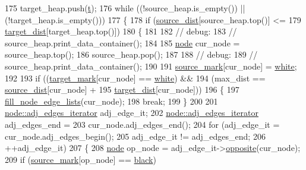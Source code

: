 \begin{DoxyCode}
175     target\_heap.push(\mbox{\hyperlink{classbid__dijkstra_a9370a71076d7807d1f3963e6dad9897e}{t}});
176     \textcolor{keywordflow}{while} ((!source\_heap.is\_empty()) || (!target\_heap.is\_empty()))
177     \{
178     \textcolor{keywordflow}{if} (\mbox{\hyperlink{classbid__dijkstra_a19dc6c350617f0fa5769e5c70781d658}{source\_dist}}[source\_heap.top()] <=
179         \mbox{\hyperlink{classbid__dijkstra_a7a46fe8fe075d798eaca14b37aa15c0d}{target\_dist}}[target\_heap.top()])
180     \{
181 
182         \textcolor{comment}{// debug:}
183         \textcolor{comment}{// source\_heap.print\_data\_container();}
184 
185         \mbox{\hyperlink{classnode}{node}} cur\_node = source\_heap.top();
186         source\_heap.pop();
187 
188         \textcolor{comment}{// debug:}
189         \textcolor{comment}{// source\_heap.print\_data\_container();}
190 
191         \mbox{\hyperlink{classbid__dijkstra_a1b3684b69db38c8eaf9d4fbb056bc392}{source\_mark}}[cur\_node] = \mbox{\hyperlink{classbid__dijkstra_a8b7dcccc9fab2ec5edc8da01029c09d5abbd36b03487d4100360b3d6e94309b7b}{white}};
192 
193         \textcolor{keywordflow}{if} ((\mbox{\hyperlink{classbid__dijkstra_a72bc13758ebe2f752cd15f018c5ba64e}{target\_mark}}[cur\_node] == \mbox{\hyperlink{classbid__dijkstra_a8b7dcccc9fab2ec5edc8da01029c09d5abbd36b03487d4100360b3d6e94309b7b}{white}}) &&
194         (max\_dist == \mbox{\hyperlink{classbid__dijkstra_a19dc6c350617f0fa5769e5c70781d658}{source\_dist}}[cur\_node] +
195             \mbox{\hyperlink{classbid__dijkstra_a7a46fe8fe075d798eaca14b37aa15c0d}{target\_dist}}[cur\_node]))
196         \{
197         \mbox{\hyperlink{classbid__dijkstra_a279264a4cee9a4a8ad45ec957245e90a}{fill\_node\_edge\_lists}}(cur\_node);
198         \textcolor{keywordflow}{break};
199         \}
200 
201         \mbox{\hyperlink{classnode_a12cb1a2167f5f03c054de5e707d3156f}{node::adj\_edges\_iterator}} adj\_edge\_it;
202         \mbox{\hyperlink{classnode_a12cb1a2167f5f03c054de5e707d3156f}{node::adj\_edges\_iterator}} adj\_edges\_end =
203         cur\_node.adj\_edges\_end();
204         \textcolor{keywordflow}{for} (adj\_edge\_it = cur\_node.adj\_edges\_begin();
205         adj\_edge\_it != adj\_edges\_end;
206         ++adj\_edge\_it)
207         \{
208         \mbox{\hyperlink{classnode}{node}} op\_node = adj\_edge\_it->\mbox{\hyperlink{classnode_a13dbd1809a33a5efede64a359e53a363}{opposite}}(cur\_node);
209         \textcolor{keywordflow}{if} (\mbox{\hyperlink{classbid__dijkstra_a1b3684b69db38c8eaf9d4fbb056bc392}{source\_mark}}[op\_node] == \mbox{\hyperlink{classbid__dijkstra_a8b7dcccc9fab2ec5edc8da01029c09d5acc2693da1b850fc6c7e79aef42fae336}{black}})

\end{DoxyCode}
